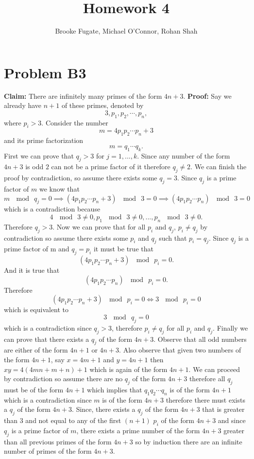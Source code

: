 \documentclass[12pt]{article}
\begin{document}
\pagestyle{plain}
\titleformat{\subsection}[runin]
  {\normalfont\large\bfseries}{\thesubsection}{1em}{}

\title{Homework 4}
\author{Brooke Fugate, Michael O'Connor, Rohan Shah}
\date{}

\maketitle

\section*{Problem B3}
\textbf{Claim:} There are infinitely many primes of the form $4n+3$.
\newline
\textbf{Proof:} Say we already have $n+1$ of these primes, denoted by
$$3, p_1, p_2, \cdots, p_n,$$
where $p_i > 3$. Consider the number
$$m = 4p_1p_2 \cdots p_n + 3$$
and its prime factorization
$$m=q_1 \cdots q_k.$$
First we can prove that $q_j > 3$ for $j = 1,...,k$. Since any number of the
form $4n+3$ is odd $2$ can not be a prime factor of it therefore $q_j \neq 2$.
We can finish the proof by
contradiction, so assume there exists some $q_j = 3$. Since $q_j$ is a prime
factor of $m$ we know that
$$m\ \mod\ q_j = 0 \implies (4p_1p_2 \cdots p_n + 3)\ \mod\ 3 = 0
\implies (4p_1p_2 \cdots p_n)\ \mod\ 3 = 0$$
which is a contradiction because
$$4\ \mod\ 3 \neq 0,p_1\ \mod\ 3 \neq 0,...,p_n\ \mod\ 3 \neq 0.$$
Therefore $q_j > 3$. Now we can prove that for all $p_i$ and $ q_j$,
$p_i \neq q_j$ by contradiction so assume there exists some $p_i$ and $q_j$ such
that $p_i = q_j$. Since $q_j$ is a prime factor of m and $q_j = p_i$ it must be
true that
$$(4p_1p_2 \cdots p_n + 3)\ \mod\ p_i = 0.$$
And it is true that
$$(4p_1p_2 \cdots p_n)\ \mod\ p_i = 0.$$
Therefore
$$(4p_1p_2 \cdots p_n + 3)\ \mod\ p_i = 0 \iff 3\ \mod\ p_i = 0$$
which is equivalent to
$$3\ \mod\ q_j = 0$$
which is a contradiction since $q_j > 3$, therefore $p_i \neq q_j$ for all $p_i$
and $q_j$. Finally we can prove that there exists a $q_j$ of the form $4n+3$.
Observe that all odd numbers are either of the form $4n+1$ or $4n+3$. Also
observe that given two numbers of the form $4n+1$, say $x = 4m+1$ and
$y = 4n+1$ then $xy = 4(4mn + m + n) + 1$ which is again of the form $4n+1$.
We can proceed by contradiction so assume there are no $q_j$ of the form
$4n+3$ therefore all $q_j$ must be of the form $4n+1$ which implies that
$q_1q_2\cdots q_n$ is of the form $4n+1$ which is a contradiction since $m$ is
of the form $4n+3$ therefore there must exists a $q_j$ of the form $4n+3$.
Since, there exists a $q_j$ of the form $4n+3$ that is greater than $3$ and not
equal to any of the first $(n+1)$ $p_i$ of the form $4n+3$ and since $q_j$ is a
prime factor of $m$, there exists a prime number of the form $4n+3$ greater than
all previous primes of the form $4n+3$ so by induction there are an infinite
number of primes of the form $4n+3$.
\end{document}
